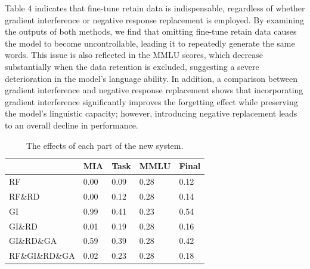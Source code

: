 \documentclass[11pt]{article}
\begin{document}
Table 4 indicates that fine-tune retain data is indispensable, regardless of whether gradient interference or negative response replacement is employed. By examining the outputs of both methods, we find that omitting fine-tune retain data causes the model to become uncontrollable, leading it to repeatedly generate the same words. This issue is also reflected in the MMLU scores, which decrease substantially when the data retention is excluded, suggesting a severe deterioration in the model's language ability. In addition, a comparison between gradient interference and negative response replacement shows that incorporating gradient interference significantly improves the forgetting effect while preserving the model’s linguistic capacity; however, introducing negative replacement leads to an overall decline in performance.
\begin{table}[h]\footnotesize
  \centering
    \begin{tabular}{l|l|l|l|l}
    \hline
        ~ & MIA & Task & MMLU & Final \\ \hline
        RF & 0.00 & 0.09 & 0.28 & 0.12 \\ \hline
        RF\&RD & 0.00 & 0.12 & 0.28 & 0.14 \\ \hline
        GI & 0.99 & 0.41 & 0.23 & 0.54 \\ \hline
        GI\&RD & 0.01 & 0.19 & 0.28 & 0.16 \\ \hline
        GI\&RD\&GA & 0.59 & 0.39 & 0.28 & 0.42 \\ \hline
        RF\&GI\&RD\&GA & 0.02 & 0.23 & 0.28 & 0.18 \\ \hline
    \end{tabular}
  \caption{The effects of each part of the new system.}
  \label{tab:accents}
\end{table}

\end{document}
